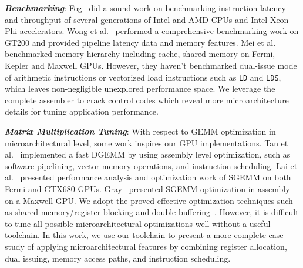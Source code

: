 {\em {\bf Benchmarking}}: 
Fog~\cite{fog} did a sound work on benchmarking instruction latency and throughput of several generations of Intel and AMD CPUs and Intel Xeon Phi accelerators. %
Wong et al.~\cite{wong} performed a 
comprehensive benchmarking work on GT200 and provided pipeline latency data and
memory features. Mei et al.~\cite{mei} benchmarked memory hierarchy including cache, shared memory on Fermi, Kepler and Maxwell GPUs.
However, they haven't benchmarked dual-issue mode of arithmetic instructions or vectorized load instructions such as {\tt LD} and {\tt LDS}, which leaves non-negligible unexplored performance space. 
We leverage the complete assembler to crack control codes which reveal more microarchitecture details for tuning application performance.

{\em {\bf Matrix Multiplication Tuning}}: 
With respect to GEMM optimization in microarchitectural level, some work inspires our GPU implementations. 
Tan et al.~\cite{tan} implemented a fast DGEMM by using 
assembly level optimization, such as software pipelining, vector memory operations, and instruction scheduling. 
Lai et al.~\cite{lai} presented performance analysis and optimization work of SGEMM on both Fermi and GTX680 GPUs. 
Gray~\cite{nervana_sgemm_wiki} presented SGEMM optimization in assembly on a Maxwell GPU. 
We adopt the proved effective optimization techniques such as shared memory/register 
blocking and double-buffering~\cite{volkov,tan}.
However, it is difficult to tune all possible microarchitectural optimizations well without a useful toolchain.
In this work, we use our toolchain to present a more complete case study of applying microarchitectural features by combining 
register allocation, dual issuing, memory access paths, and instruction scheduling.
